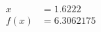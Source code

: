 \documentclass[preview]{standalone}
\begin{document}
\begin{align*}
x &= 1.6222\\f(x) &= 6.3062175
\end{align*}
\end{document}
